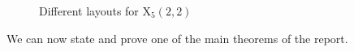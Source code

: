 \begin{figure}[!h]
\centering
\caption{Different layouts for ${\text{X}}_5(2,2)$}
\end{figure}
We can now state and prove one of the main theorems of the report.

